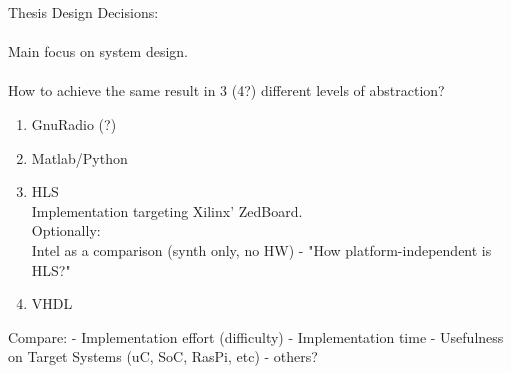 
Thesis Design Decisions: \\
\\
Main focus on system design. \\
\\
How to achieve the same result in 3 (4?) different levels of abstraction?

\begin{enumerate}
  \item GnuRadio (?)
  \item Matlab/Python
  \item HLS\\
      Implementation targeting Xilinx' ZedBoard.\\
      Optionally: \\
      Intel as a comparison (synth only, no HW) - "How platform-independent is HLS?"
  \item VHDL
\end{enumerate}
\vspace{.5 cm}

Compare:
- Implementation effort (difficulty)
- Implementation time
- Usefulness on Target Systems (uC, SoC, RasPi, etc)
- others?
